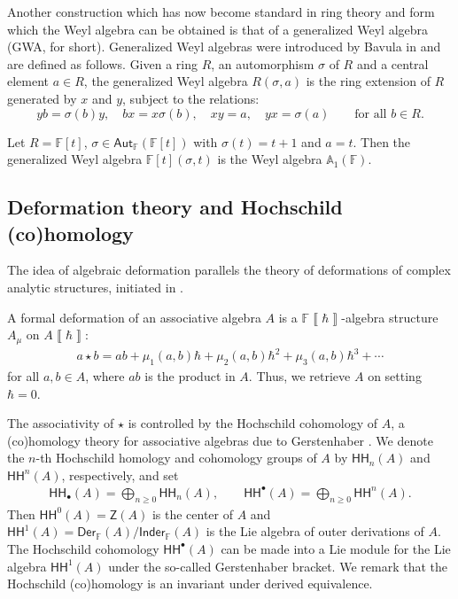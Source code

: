 \documentclass{commat}
\newcommand\q{\quad}
\newcommand{\FF}{\mathbb{F}}
\newcommand{\wa}[1][1]{\mathbb{A}_{#1}}
\newcommand\inder{ \mathsf {Inder_\FF}}
\newcommand\der[1][\FF]{ \mathsf{Der}_{#1}}
\newcommand\aut[1][\FF]{ \mathsf{Aut}_{#1}}
\newcommand\hoch{\mathsf{HH}}
\newcommand{\formal}[1]{\left\llbracket #1\right\rrbracket}
\begin{document}
Another construction which has now become standard in ring theory and form which the Weyl algebra can be obtained is that of a generalized Weyl algebra (GWA, for short). Generalized Weyl algebras were introduced by Bavula in \cite{vB91} and are defined as follows. Given a ring $R$, an automorphism $\sigma$ of $R$ and a central element $a\in R$, the generalized Weyl algebra $R(\sigma, a)$ is the ring extension of $R$ generated by $x$ and $y$, subject to the relations:
\begin{equation}\label{E:noeth:gwa}
	yb=\sigma (b)y, \quad bx=x\sigma (b), \quad xy=a, \quad yx=\sigma (a)  \quad\quad \text{for all $b\in R$.}
\end{equation}
\begin{example}
	Let $R=\FF[t]$, $\sigma\in\aut(\FF[t])$ with $\sigma(t)=t+1$ and $a=t$. Then the generalized Weyl algebra $\FF[t](\sigma, t)$ is the Weyl algebra $\wa(\FF)$. 
\end{example}


\subsection{Deformation theory and Hochschild (co)homology}\label{SS:intro:wa:deform}

The idea of algebraic deformation parallels the theory of deformations of complex analytic structures, initiated in \cite{KS58}. 

A formal deformation of an associative algebra $A$ is a $\FF\formal{\hbar}$-algebra structure $A_\mu$ on $A\formal{\hbar}$:
\begin{align*}\label{E:intro:wa:ring:star}
	a\star b=ab+\mu_1(a, b)\hbar +\mu_2(a, b)\hbar^2+\mu_3(a, b)\hbar^3 + \cdots
\end{align*}
for all $a, b\in A$, where $ab$ is the product in $A$. Thus, we retrieve $A$ on setting $\hbar=0$. 

The associativity of $\star$ is controlled by the Hochschild cohomology of $A$, a (co)homology theory for associative algebras due to Gerstenhaber \cite{mG64}. We denote the $n$-th Hochschild homology and cohomology groups of $A$ by $\hoch_n(A)$ and $\hoch^n(A)$, respectively, and set
\begin{align*}
	\hoch_\bullet(A)=\bigoplus_{n\geq 0}\hoch_n(A),\q\q \hoch^\bullet(A)=\bigoplus_{n\geq 0}\hoch^n(A).
\end{align*}
Then $\hoch^0(A)=\mathsf{Z}(A)$ is the center of $A$ and $\hoch^1(A)=\der(A)/\inder(A)$ is the Lie algebra of outer derivations of $A$. The Hochschild cohomology $\hoch^{\bullet}(A)$ can be made into a Lie module for the Lie algebra $\hoch^1(A)$ under the so-called Gerstenhaber bracket. We remark that the Hochschild (co)homology is an invariant under derived equivalence.
\end{document}
